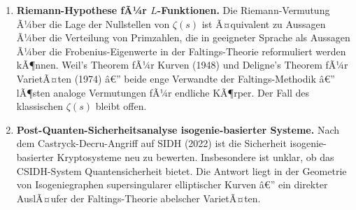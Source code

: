 ﻿\documentclass[12pt,a4paper]{article}
\theoremstyle{plain}
\theoremstyle{definition}
\theoremstyle{remark}
\begin{document}
\begin{enumerate}[leftmargin=2em,itemsep=6pt, label=\textbf{(\arabic*)}]
  \item \textbf{Riemann-Hypothese fÃ¼r $L$-Funktionen.}
    Die Riemann-Vermutung Ã¼ber die Lage der Nullstellen von $\zeta(s)$
    ist Ã¤quivalent zu Aussagen Ã¼ber die Verteilung von Primzahlen,
    die in geeigneter Sprache als Aussagen Ã¼ber die Frobenius-Eigenwerte
    in der Faltings-Theorie reformuliert werden kÃ¶nnen.
    Weil's Theorem fÃ¼r Kurven (1948) und Deligne's Theorem fÃ¼r VarietÃ¤ten (1974)
    â€” beide enge Verwandte der Faltings-Methodik â€” lÃ¶sten analoge Vermutungen
    fÃ¼r endliche KÃ¶rper. Der Fall des klassischen $\zeta(s)$ bleibt offen.

  \item \textbf{Post-Quanten-Sicherheitsanalyse isogenie-basierter Systeme.}
    Nach dem Cast\-ryck-Decru-Angriff auf SIDH (2022) ist die Sicherheit
    isogenie-basierter Kryptosysteme neu zu bewerten. Insbesondere ist unklar,
    ob das CSIDH-System Quantensicherheit bietet. Die Antwort liegt in der
    Geometrie von Isogeniegraphen supersingularer elliptischer Kurven â€”
    ein direkter AuslÃ¤ufer der Faltings-Theorie abelscher VarietÃ¤ten.
\end{enumerate}
\end{document}
